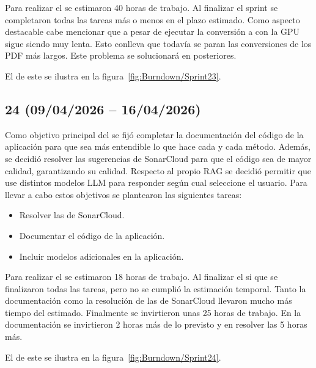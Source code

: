 Para realizar el  se estimaron 40 horas de trabajo. Al finalizar el sprint se completaron todas las tareas más o menos en el plazo estimado. Como aspecto destacable cabe mencionar que a pesar de ejecutar la conversión a  con la GPU sigue siendo muy lenta. Esto conlleva que todavía se paran las conversiones de los PDF más largos. Este problema se solucionará en  posteriores.

El  de este  se ilustra en la figura~\ref{fig:Burndown/Sprint23}.

\subsection{ 24 (09/04/2026 -- 16/04/2026)}
Como objetivo principal del  se fijó completar la documentación del código de la aplicación para que sea más entendible lo que hace cada  y cada método. Además, se decidió resolver las sugerencias de SonarCloud para que el código sea de mayor calidad, garantizando su calidad. Respecto al propio RAG se decidió permitir que use distintos modelos LLM para responder según cual seleccione el usuario. Para llevar a cabo estos objetivos se plantearon las siguientes tareas:

\begin{itemize}
\tightlist
	\item Resolver las  de SonarCloud.
	\item Documentar el código de la aplicación.
	\item Incluir modelos adicionales en la aplicación.
\end{itemize}

Para realizar el  se estimaron 18 horas de trabajo. Al finalizar el  si que se finalizaron todas las tareas, pero no se cumplió la estimación temporal. Tanto la documentación como la resolución de las  de SonarCloud llevaron mucho más tiempo del estimado. Finalmente se invirtieron unas 25 horas de trabajo. En la documentación se invirtieron 2 horas más de lo previsto y en resolver las  5 horas más.  

El  de este  se ilustra en la figura~\ref{fig:Burndown/Sprint24}.

